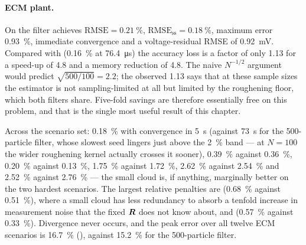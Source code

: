 \paragraph{ECM plant.}  On  the filter achieves $\mathrm{RMSE} = \SI{0.21}{\percent}$,
$\mathrm{RMSE}_{\mathrm{ss}} = \SI{0.18}{\percent}$, maximum error \SI{0.93}{\percent}, immediate
convergence and a voltage-residual RMSE of \SI{0.92}{\milli\volt}.  Compared with
 (\SI{0.16}{\percent} at \SI{76.4}{\micro\second}) the accuracy loss is a
factor of only \num{1.13} for a speed-up of \num{4.8} and a memory reduction of \num{4.8}.  The
naive $N^{-1/2}$ argument would predict $\sqrt{500/100} = \num{2.2}$; the observed \num{1.13} says
that at these sample sizes the estimator is not sampling-limited at all but limited by the
roughening floor, which both filters share.  Five-fold savings are therefore essentially free on
this problem, and that is the single most useful result of this chapter.

Across the scenario set:  \SI{0.18}{\percent} with convergence in
\SI{5}{\second} (against \SI{73}{\second} for the 500-particle filter, whose slowest seed lingers
just above the \SI{2}{\percent} band --- at $N=100$ the wider roughening kernel actually crosses it
sooner),  \SI{0.39}{\percent} against \SI{0.36}{\percent}, 
\SI{0.20}{\percent} against \SI{0.13}{\percent},  \SI{1.75}{\percent} against
\SI{1.72}{\percent},  \SI{2.62}{\percent} against \SI{2.54}{\percent} and
 \SI{2.52}{\percent} against \SI{2.76}{\percent} --- the small cloud is, if anything,
marginally better on the two hardest scenarios.  The largest relative penalties are
 (\SI{0.68}{\percent} against \SI{0.51}{\percent}), where a small cloud has less
redundancy to absorb a tenfold increase in measurement noise that the fixed $\bm{R}$ does not know
about, and  (\SI{0.57}{\percent} against \SI{0.33}{\percent}).  Divergence never occurs,
and the peak error over all twelve ECM scenarios is \SI{16.7}{\percent} (), against
\SI{15.2}{\percent} for the 500-particle filter.

